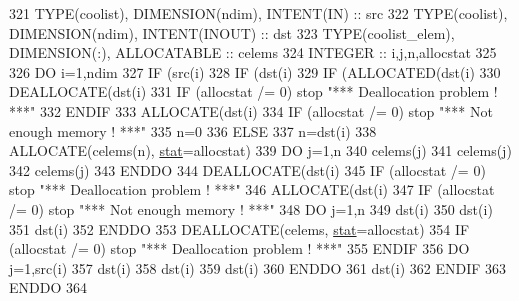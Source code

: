 \begin{DoxyCode}
321     \textcolor{keywordtype}{TYPE}(coolist), \textcolor{keywordtype}{DIMENSION(ndim)}, \textcolor{keywordtype}{INTENT(IN)} :: src
322     \textcolor{keywordtype}{TYPE}(coolist), \textcolor{keywordtype}{DIMENSION(ndim)}, \textcolor{keywordtype}{INTENT(INOUT)} :: dst
323     \textcolor{keywordtype}{TYPE}(coolist\_elem), \textcolor{keywordtype}{DIMENSION(:)}, \textcolor{keywordtype}{ALLOCATABLE} :: celems
324     \textcolor{keywordtype}{INTEGER} :: i,j,n,allocstat
325 
326     \textcolor{keywordflow}{DO} i=1,ndim
327        \textcolor{keywordflow}{IF} (src(i)%
328           \textcolor{keywordflow}{IF} (dst(i)%
329              \textcolor{keywordflow}{IF} (\textcolor{keyword}{ALLOCATED}(dst(i)%
330                 \textcolor{keyword}{DEALLOCATE}(dst(i)%
331                 \textcolor{keywordflow}{IF} (allocstat /= 0) stop \textcolor{stringliteral}{"*** Deallocation problem ! ***"}
332 \textcolor{keywordflow}{             ENDIF}
333              \textcolor{keyword}{ALLOCATE}(dst(i)%
334              \textcolor{keywordflow}{IF} (allocstat /= 0) stop \textcolor{stringliteral}{"*** Not enough memory ! ***"}
335              n=0
336           \textcolor{keywordflow}{ELSE}
337              n=dst(i)%
338              \textcolor{keyword}{ALLOCATE}(celems(n), \hyperlink{namespacestat}{stat}=allocstat)
339              \textcolor{keywordflow}{DO} j=1,n
340                 celems(j)%
341                 celems(j)%
342                 celems(j)%
343 \textcolor{keywordflow}{             ENDDO}
344              \textcolor{keyword}{DEALLOCATE}(dst(i)%
345              \textcolor{keywordflow}{IF} (allocstat /= 0) stop \textcolor{stringliteral}{"*** Deallocation problem ! ***"}
346              \textcolor{keyword}{ALLOCATE}(dst(i)%
347              \textcolor{keywordflow}{IF} (allocstat /= 0) stop \textcolor{stringliteral}{"*** Not enough memory ! ***"}
348              \textcolor{keywordflow}{DO} j=1,n
349                 dst(i)%
350                 dst(i)%
351                 dst(i)%
352 \textcolor{keywordflow}{             ENDDO}
353              \textcolor{keyword}{DEALLOCATE}(celems, \hyperlink{namespacestat}{stat}=allocstat)
354              \textcolor{keywordflow}{IF} (allocstat /= 0) stop \textcolor{stringliteral}{"*** Deallocation problem ! ***"}
355 \textcolor{keywordflow}{          ENDIF}
356           \textcolor{keywordflow}{DO} j=1,src(i)%
357              dst(i)%
358              dst(i)%
359              dst(i)%
360 \textcolor{keywordflow}{          ENDDO}
361           dst(i)%
362 \textcolor{keywordflow}{       ENDIF}
363 \textcolor{keywordflow}{    ENDDO}
364 
\end{DoxyCode}
